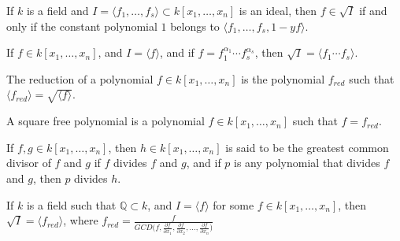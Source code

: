 \documentclass[crop=false,class=book,oneside]{standalone}
\begin{document}
                \begin{theorem}
                    If $k$ is a field and
                    $I=\langle f_1,\hdots,f_s\rangle\subset k[x_1,\hdots,x_n]$
                    is an ideal, then $f\in \sqrt{I}$ if and only if
                    the constant polynomial $1$ belongs to
                    $\langle f_1,\hdots, f_s, 1-yf\rangle$.
                \end{theorem}
                \begin{theorem}
                    If $f\in k[x_1,\hdots ,x_n]$, and
                    $I=\langle f\rangle$, and if
                    $f=f_1^{\alpha_1}\cdots f_s^{\alpha_s}$,
                    then $\sqrt{I}=\langle f_1\cdots f_s\rangle$.
                \end{theorem}
                \begin{definition}
                    The reduction of a polynomial
                    $f\in k[x_1,\hdots ,x_n]$ is the polynomial
                    $f_{red}$ such that
                    $\langle f_{red}\rangle=\sqrt{\langle f\rangle}$.
                \end{definition}
                \begin{definition}
                    A square free polynomial is a polynomial
                    $f\in k[x_1,\hdots ,x_n]$ such that $f=f_{red}$.
                \end{definition}
                \begin{definition}
                    If $f,g\in k[x_1,\hdots ,x_n]$, then
                    $h\in k[x_1,\hdots ,x_n]$ is said to be the
                    greatest common divisor of $f$ and $g$ if $f$
                    divides $f$ and $g$, and if $p$ is any polynomial
                    that divides $f$ and $g$, then $p$ divides $h$.
                \end{definition}
                \begin{theorem}
                    If $k$ is a field such that $\mathbb{Q}\subset k$,
                    and $I=\langle f\rangle$ for some
                    $f\in k[x_1,\hdots ,x_n]$, then
                    $\sqrt{I}=\langle f_{red}\rangle$,
                    where
                    $f_{red}=\frac{f}{GCD%
                         \big(%
                             f,%
                             \frac{\partial f}{\partial x_1},%
                             \frac{\partial f}{\partial x_2},%
                             \hdots,%
                             \frac{\partial f}{\partial x_n}%
                         \big)}$
                \end{theorem}
\end{document}
